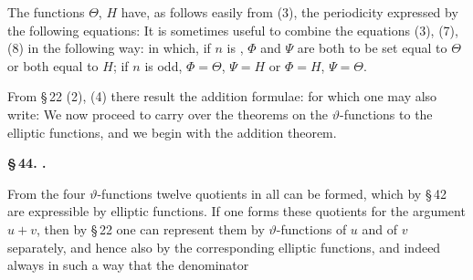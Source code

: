 
The functions $\Theta$, $H$ have, as follows easily from (3), the
periodicity expressed by the following equations:
It is sometimes useful to combine the equations (3), (7), (8)
in the following way:
in which, if $n$ is , $\Phi$ and $\Psi$ are both to be set equal to
$\Theta$ or both equal to $H$; if $n$ is odd, $\Phi=\Theta$, $\Psi=H$ or
$\Phi=H$, $\Psi=\Theta$.

From \S\,22 (2), (4) there result the addition formulae:
for which one may also write:
We now proceed to carry over the theorems on the $\vartheta$-functions
to the elliptic functions, and we begin with
the addition theorem.

\begin{center}
\textbf{\S\,44. .}
\end{center}

From the four $\vartheta$-functions twelve quotients in all can be
formed, which by \S\,42 are expressible by elliptic functions.
If one forms these quotients for the argument
$u+v$, then by \S\,22 one can represent them by $\vartheta$-functions of $u$
and of $v$ separately, and hence also by the corresponding elliptic
 functions, and indeed always in such a way that the denominator
